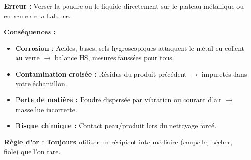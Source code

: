 \documentclass[11pt]{article}
\begin{document}
\begin{attention}
\textbf{Erreur :} Verser la poudre ou le liquide directement sur le plateau métallique ou en verre de la balance.
\par\textbf{Conséquences :}
\begin{itemize}
    \item \textbf{Corrosion :} Acides, bases, sels hygroscopiques attaquent le métal ou collent au verre $\rightarrow$ balance HS, mesures faussées pour tous.
    \item \textbf{Contamination croisée :} Résidus du produit précédent $\rightarrow$ impuretés dans votre échantillon.
    \item \textbf{Perte de matière :} Poudre dispersée par vibration ou courant d'air $\rightarrow$ masse lue incorrecte.
    \item \textbf{Risque chimique :} Contact peau/produit lors du nettoyage forcé.
\end{itemize}
\textbf{Règle d'or :} \textbf{Toujours} utiliser un récipient intermédiaire (coupelle, bécher, fiole) que l'on tare.
\end{attention}
\end{document}
